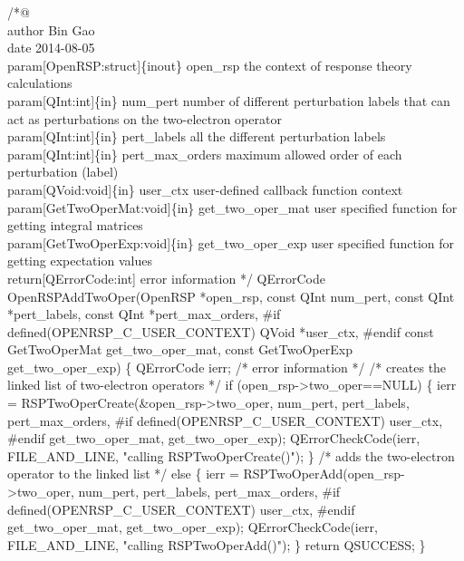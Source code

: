 /*@%
     \\author Bin Gao
     \\date 2014-08-05
     \\param[OpenRSP:struct]\{inout\} open_rsp the context of response theory calculations
     \\param[QInt:int]\{in\} num_pert number of different perturbation labels that can
         act as perturbations on the two-electron operator
     \\param[QInt:int]\{in\} pert_labels all the different perturbation labels
     \\param[QInt:int]\{in\} pert_max_orders maximum allowed order of each perturbation (label)
     \\param[QVoid:void]\{in\} user_ctx user-defined callback function context
     \\param[GetTwoOperMat:void]\{in\} get_two_oper_mat user specified function for
         getting integral matrices
     \\param[GetTwoOperExp:void]\{in\} get_two_oper_exp user specified function for
         getting expectation values
     \\return[QErrorCode:int] error information
*/
QErrorCode OpenRSPAddTwoOper(OpenRSP *open_rsp,
                             const QInt num_pert,
                             const QInt *pert_labels,
                             const QInt *pert_max_orders,
#if defined(OPENRSP_C_USER_CONTEXT)
                             QVoid *user_ctx,
#endif
                             const GetTwoOperMat get_two_oper_mat,
                             const GetTwoOperExp get_two_oper_exp)
\{
    QErrorCode ierr;  /* error information */
    /* creates the linked list of two-electron operators */
    if (open_rsp->two_oper==NULL) \{
        ierr = RSPTwoOperCreate(&open_rsp->two_oper,
                                num_pert,
                                pert_labels,
                                pert_max_orders,
#if defined(OPENRSP_C_USER_CONTEXT)
                                user_ctx,
#endif
                                get_two_oper_mat,
                                get_two_oper_exp);
        QErrorCheckCode(ierr, FILE_AND_LINE, "calling RSPTwoOperCreate()");
    \}
    /* adds the two-electron operator to the linked list */
    else \{
        ierr = RSPTwoOperAdd(open_rsp->two_oper,
                             num_pert,
                             pert_labels,
                             pert_max_orders,
#if defined(OPENRSP_C_USER_CONTEXT)
                             user_ctx,
#endif
                             get_two_oper_mat,
                             get_two_oper_exp);
        QErrorCheckCode(ierr, FILE_AND_LINE, "calling RSPTwoOperAdd()");
    \}
    return QSUCCESS;
\}
\nwendcode{}\nwdocspar

